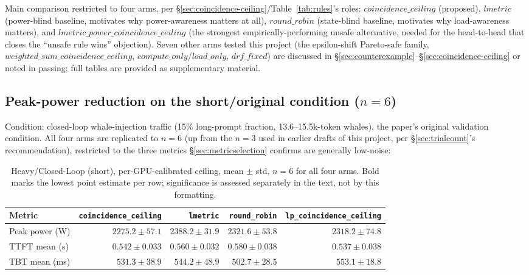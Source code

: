 \documentclass[sigconf,review,anonymous]{acmart}
\begin{document}
Main comparison restricted to four arms, per \S\ref{sec:coincidence-ceiling}/Table~\ref{tab:rules}'s
roles: $\mathit{coincidence\_ceiling}$ (proposed), $\mathit{lmetric}$ (power-blind baseline,
motivates why power-awareness matters at all), $\mathit{round\_robin}$ (state-blind baseline,
motivates why load-awareness matters), and $\mathit{lmetric\_power\_coincidence\_ceiling}$
(the strongest empirically-performing unsafe alternative, needed for the head-to-head that
closes the ``unsafe rule wins'' objection). Seven other arms tested this project (the
epsilon-shift Pareto-safe family, $\mathit{weighted\_sum\_coincidence\_ceiling}$,
$\mathit{compute\_only}$/$\mathit{load\_only}$, $\mathit{drf\_fixed}$) are discussed in
\S\ref{sec:counterexample}--\S\ref{sec:coincidence-ceiling} or noted in passing; full tables
are provided as supplementary material.

\subsection{Peak-power reduction on the short/original condition ($n{=}6$)}
\label{sec:eval-dominance}

Condition: closed-loop whale-injection traffic (15\% long-prompt fraction, 13.6--15.5k-token
whales), the paper's original validation condition. All four arms are replicated to
\textbf{$n{=}6$} (up from the $n{=}3$ used in earlier drafts of this project, per
\S\ref{sec:trialcount}'s recommendation), restricted to the three metrics
\S\ref{sec:metricselection} confirms are generally low-noise:

\begin{table}[t]
  \caption{Heavy/Closed-Loop (short), per-GPU-calibrated ceiling, mean $\pm$ std, $n{=}6$ for
    all four arms. Bold marks the lowest point estimate per row; significance is assessed
    separately in the text, not by this formatting.}
  \label{tab:headline}
  \footnotesize
  \setlength{\tabcolsep}{3pt}
  \begin{tabular}{@{}lrrrr@{}}
    \toprule
    Metric & \texttt{coincidence\_ceiling} & \texttt{lmetric} & \texttt{round\_robin} & \texttt{lp\_coincidence\_ceiling} \\
    \midrule
    Peak power (W)   & $\mathbf{2275.2{\pm}57.1}$ & $2388.2{\pm}31.9$ & $2321.6{\pm}53.8$ & $2318.2{\pm}74.8$ \\
    TTFT mean (s)    & $0.542{\pm}0.033$ & $0.560{\pm}0.032$ & $0.580{\pm}0.038$ & $0.537{\pm}0.038$ \\
    TBT mean (ms)    & $531.3{\pm}38.9$  & $544.2{\pm}48.9$ & $\mathbf{502.7{\pm}28.5}$ & $553.1{\pm}18.8$ \\
    \bottomrule
  \end{tabular}
\end{table}
\end{document}
